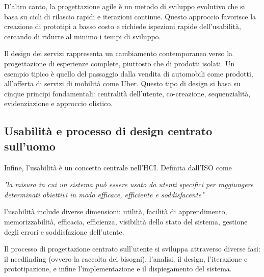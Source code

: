 D'altro canto, la progettazione agile è un metodo di sviluppo evolutivo che si basa su cicli di rilascio rapidi e iterazioni continue. Questo approccio favorisce la creazione di prototipi a basso costo e richiede ispezioni rapide dell’usabilità, cercando di ridurre al minimo i tempi di sviluppo.

Il design dei servizi rappresenta un cambiamento contemporaneo verso la progettazione di esperienze complete, piuttosto che di prodotti isolati. Un esempio tipico è quello del passaggio dalla vendita di automobili come prodotti, all’offerta di servizi di mobilità come Uber. Questo tipo di design si basa su cinque principi fondamentali: centralità dell’utente, co-creazione, sequenzialità, evidenziazione e approccio olistico.

\subsection{Usabilità e processo di design centrato sull'uomo}
Infine, l’usabilità è un concetto centrale nell’HCI. Definita dall'ISO come 
\begin{center}
\textit{"la misura in cui un sistema può essere usato da utenti specifici per raggiungere determinati obiettivi in modo efficace, efficiente e soddisfacente"}    
\end{center}
l'usabilità include diverse dimensioni: utilità, facilità di apprendimento, memorizzabilità, efficacia, efficienza, visibilità dello stato del sistema, gestione degli errori e soddisfazione dell'utente.

Il processo di progettazione centrato sull'utente si sviluppa attraverso diverse fasi: il needfinding (ovvero la raccolta dei bisogni), l’analisi, il design, l'iterazione e prototipazione, e infine l’implementazione e il dispiegamento del sistema.